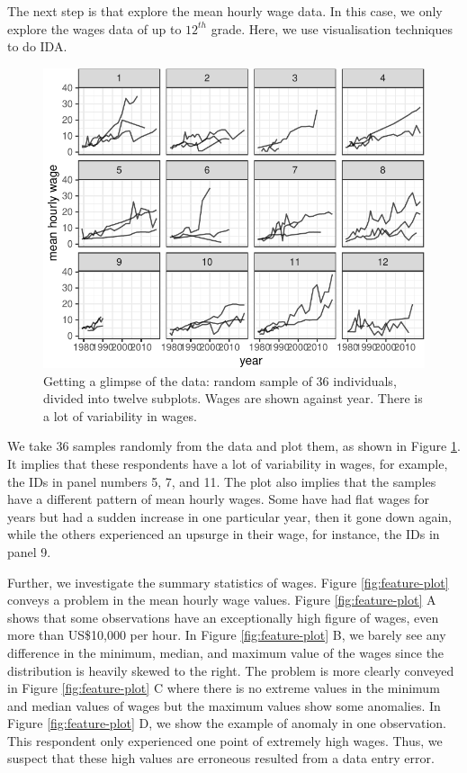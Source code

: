 \documentclass{article}
\begin{document}
The next step is that explore the mean hourly wage data. In this case, we only explore the wages data of up to \(12^{th}\) grade. Here, we use visualisation techniques to do IDA.

\begin{figure}

{\centering \includegraphics[width=0.7\linewidth]{figures/sample-plot-1} 

}

\caption{Getting a glimpse of the data: random sample of 36 individuals, divided into  twelve subplots. Wages are shown against year. There is a lot of variability in wages.}\label{fig:sample-plot}
\end{figure}

We take 36 samples randomly from the data and plot them, as shown in Figure \ref{fig:sample-plot}. It implies that these respondents have a lot of variability in wages, for example, the IDs in panel numbers 5, 7, and 11. The plot also implies that the samples have a different pattern of mean hourly wages. Some have had flat wages for years but had a sudden increase in one particular year, then it gone down again, while the others experienced an upsurge in their wage, for instance, the IDs in panel 9.

Further, we investigate the summary statistics of wages.
Figure \ref{fig:feature-plot} conveys a problem in the mean hourly wage values. Figure \ref{fig:feature-plot} A shows that some observations have an exceptionally high figure of wages, even more than US\$10,000 per hour. In Figure \ref{fig:feature-plot} B, we barely see any difference in the minimum, median, and maximum value of the wages since the distribution is heavily skewed to the right. The problem is more clearly conveyed in Figure \ref{fig:feature-plot} C where there is no extreme values in the minimum and median values of wages but the maximum values show some anomalies. In Figure \ref{fig:feature-plot} D, we show the example of anomaly in one observation. This respondent only experienced one point of extremely high wages. Thus, we suspect that these high values are erroneous resulted from a data entry error.
\end{document}
